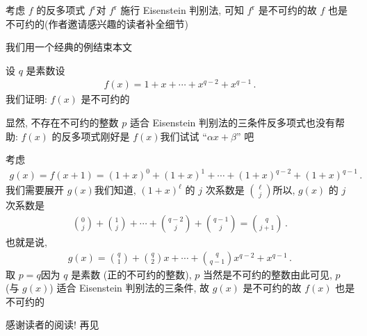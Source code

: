 \begin{pf}
    考虑 $f$ 的反多项式 $f^{\mathrm{r}}$\period 对 $f^{\mathrm{r}}$ 施行 Eisenstein 判别法, 可知 $f^{\mathrm{r}}$ 是不可约的\period 故 $f$ 也是不可约的\period (作者邀请感兴趣的读者补全细节\period)
\end{pf}

我们用一个经典的例结束本文\period

\begin{example}
    设 $q$ 是素数\period 设
    \begin{align*}
        f(x) = 1 + x + \cdots + x^{q-2} + x^{q-1} \period
    \end{align*}
    我们证明: $f(x)$ 是不可约的\period

    显然, 不存在不可约的整数 $p$ 适合 Eisenstein 判别法的三条件\period 反多项式也没有帮助: $f(x)$ 的反多项式刚好是 $f(x)$\period 我们试试 ``$\alpha x + \beta$'' 吧\period

    考虑
    \begin{align*}
        g(x) = f(x + 1) = (1 + x)^0 + (1 + x)^1 + \cdots + (1 + x)^{q - 2} + (1 + x)^{q - 1} \period
    \end{align*}
    我们需要展开 $g(x)$\period 我们知道, $(1 + x)^\ell$ 的 $j$ 次系数是 $\binom{\ell}{j}$\period 所以, $g(x)$ 的 $j$ 次系数是
    \begin{align*}
        \binom{0}{j} + \binom{1}{j} + \cdots + \binom{q-2}{j} + \binom{q-1}{j} = \binom{q}{j + 1} \period
    \end{align*}
    也就是说,
    \begin{align*}
        g(x) = \binom{q}{1} + \binom{q}{2} x + \cdots + \binom{q}{q - 1} x^{q-2} + x^{q-1} \period
    \end{align*}
    取 $p = q$\period 因为 $q$ 是素数 (正的不可约的整数), $p$ 当然是不可约的整数\period 由此可见, $p$ (与 $g(x)$) 适合 Eisenstein 判别法的三条件, 故 $g(x)$ 是不可约的\period 故 $f(x)$ 也是不可约的\period
\end{example}

感谢读者的阅读! 再见\period
